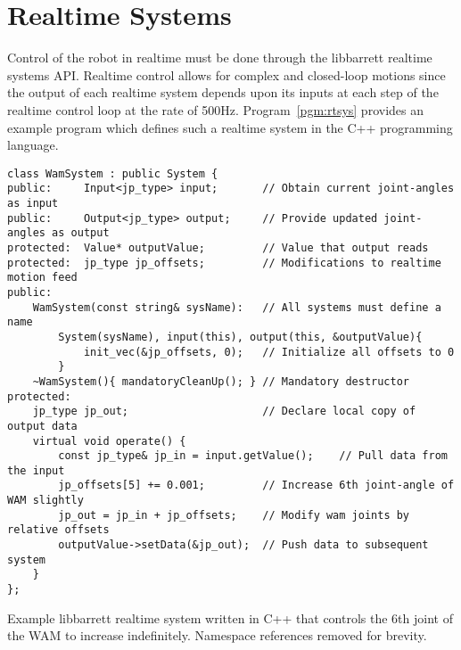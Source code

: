 \section{Realtime Systems}
\label{sec:realtime_eg}
Control of the robot in realtime must be done through the libbarrett realtime systems API.
Realtime control allows for complex and closed-loop motions since the output of each realtime system depends upon its inputs at each step of the realtime control loop at the rate of 500Hz.
Program~\ref{pgm:rtsys} provides an example program which defines such a realtime system in the C++ programming language.

\begin{landscape}
\begin{Program}[width=0.5\pagewidth]
\center
\begin{verbatim}
class WamSystem : public System {
public:     Input<jp_type> input;       // Obtain current joint-angles as input
public:     Output<jp_type> output;     // Provide updated joint-angles as output
protected:  Value* outputValue;         // Value that output reads
protected:  jp_type jp_offsets;         // Modifications to realtime motion feed
public:
    WamSystem(const string& sysName):   // All systems must define a name
        System(sysName), input(this), output(this, &outputValue){ 
            init_vec(&jp_offsets, 0);   // Initialize all offsets to 0
        }
    ~WamSystem(){ mandatoryCleanUp(); } // Mandatory destructor 
protected:
    jp_type jp_out;                     // Declare local copy of output data
    virtual void operate() {
        const jp_type& jp_in = input.getValue();    // Pull data from the input
        jp_offsets[5] += 0.001;         // Increase 6th joint-angle of WAM slightly
        jp_out = jp_in + jp_offsets;    // Modify wam joints by relative offsets
        outputValue->setData(&jp_out);  // Push data to subsequent system
    }
};
\end{verbatim}
  \caption{Example libbarrett realtime system written in C++ that controls the 6th joint of the WAM to increase indefinitely. Namespace references removed for brevity.}
  \label{pgm:rtsys}
\end{Program}
\end{landscape}


